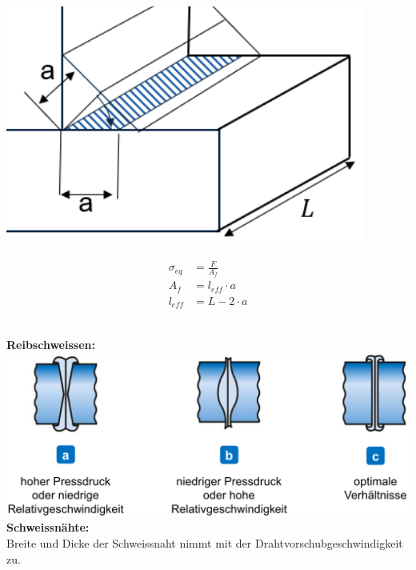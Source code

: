 \begin{minipage}{0.55\linewidth}
    \includegraphics[width=0.8\linewidth]{src/images/Schweissnaht.png}\\
\end{minipage}
\begin{minipage}{0.30\linewidth}
    \[
        \boxed{     
            \begin{aligned}
                \sigma_{eq} &= \frac{F}{A_f}\\
                A_f &= l_{eff} \cdot a\\
                l_{eff} &= L - 2 \cdot a
            \end{aligned}
        }
        \]
\end{minipage}\\

\textbf{Reibschweissen:}\\
\includegraphics[width=\linewidth]{src/images/Reibschweissen.jpeg} \\

\textbf{Schweissnähte:} \\
Breite und Dicke der Schweissnaht nimmt mit der Drahtvorschubgeschwindigkeit zu.\\

